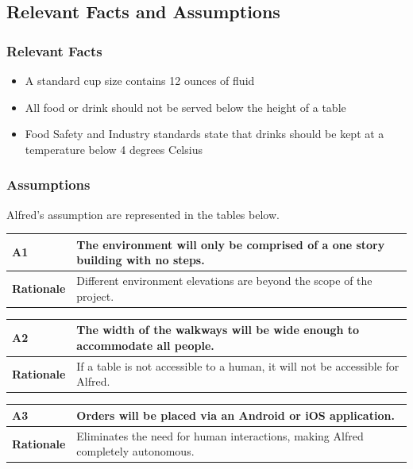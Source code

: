 \documentclass [11pt]{article}
\begin{document}
\subsection{Relevant Facts and Assumptions} 

\subsubsection{Relevant Facts}
\begin{itemize}
	\item A standard cup size contains 12 ounces of fluid
	\item All food or drink should not be served below the height of a table
	\item Food Safety and Industry standards state that drinks should be kept at a temperature below 4 degrees Celsius
\end{itemize}

\subsubsection{Assumptions}
Alfred's assumption are represented in the tables below. 
\begin{longtable}{| p{ } | p{ } | }\hline 
\rowcolor{tableCell}\textbf{A1} & The environment will only be comprised of a one story building with no steps. \\ \hline
\textbf{Rationale} & Different environment elevations are beyond the scope of the project. \\ \hline 
\end{longtable}

\begin{longtable}{| p{ } | p{ } | }\hline 
\rowcolor{tableCell}\textbf{A2} & The width of the walkways will be wide enough to accommodate all people. \\ \hline
\textbf{Rationale} &  If a table is not accessible to a human, it will not be accessible for Alfred.\\ \hline
\end{longtable}

\begin{longtable}{| p{ } | p{ } | }\hline 
\rowcolor{tableCell}\textbf{A3} & Orders will be placed via an Android or iOS application. \\ \hline
\textbf{Rationale} &  Eliminates the need for human interactions, making Alfred completely autonomous. \\ \hline
\end{longtable}
\end{document}
